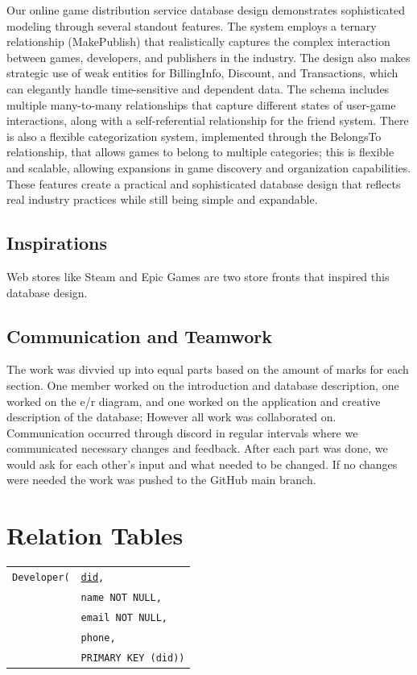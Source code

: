 \documentclass[12pt, oneside]{article}
\begin{document}
Our online game distribution service database design demonstrates sophisticated modeling through several standout features. The system employs a ternary relationship (MakePublish) that realistically captures the complex interaction between games, developers, and publishers in the industry. The design also makes strategic use of weak entities for BillingInfo, Discount, and Transactions, which can elegantly handle time-sensitive and dependent data. The schema includes multiple many-to-many relationships that capture different states of user-game interactions, along with a self-referential relationship for the friend system. There is also a flexible categorization system, implemented through the BelongsTo relationship, that allows games to belong to multiple categories; this is flexible and scalable, allowing expansions in game discovery and organization capabilities. These features create a practical and sophisticated database design that reflects real industry practices while still being simple and expandable.

\subsection{Inspirations}

Web stores like Steam and Epic Games are two store fronts that inspired this database design.

\subsection{Communication and Teamwork}

The work was divvied up into equal parts based on the amount of marks for each section. One member worked on the introduction and database description, one worked on the e/r diagram, and one worked on the application and creative description of the database; However all work was collaborated on. Communication occurred through discord in regular intervals where we communicated necessary changes and feedback. After each part was done, we would ask for each other's input and what needed to be changed. If no changes were needed the work was pushed to the GitHub main branch.

\section{Relation Tables}
\begin{tabular}{l@{}l}
    \texttt{Developer(} & \texttt{\underline{did},}\\
                         & \texttt{name NOT NULL,}\\
                         & \texttt{email NOT NULL,}\\
                         & \texttt{phone,}\\
                         & \texttt{PRIMARY KEY (did))}
\end{tabular}
\end{document}
